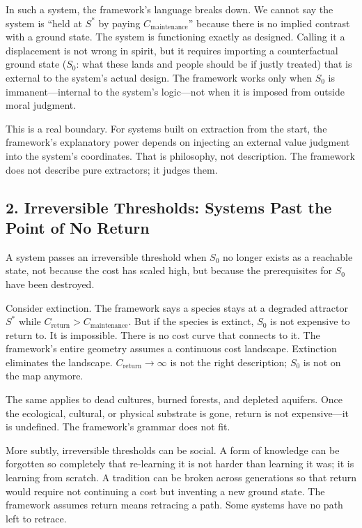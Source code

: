 \documentclass[12pt]{article}
\begin{document}
In such a system, the framework's language breaks down. We cannot say the system is ``held at $S^*$ by paying $C_{\text{maintenance}}$'' because there is no implied contrast with a ground state. The system is functioning exactly as designed. Calling it a displacement is not wrong in spirit, but it requires importing a counterfactual ground state ($S_0$: what these lands and people should be if justly treated) that is external to the system's actual design. The framework works only when $S_0$ is immanent—internal to the system's logic—not when it is imposed from outside moral judgment.

This is a real boundary. For systems built on extraction from the start, the framework's explanatory power depends on injecting an external value judgment into the system's coordinates. That is philosophy, not description. The framework does not describe pure extractors; it judges them.

\subsection{2. Irreversible Thresholds: Systems Past the Point of No Return}

A system passes an irreversible threshold when $S_0$ no longer exists as a reachable state, not because the cost has scaled high, but because the prerequisites for $S_0$ have been destroyed.

Consider extinction. The framework says a species stays at a degraded attractor $S^*$ while $C_{\text{return}} > C_{\text{maintenance}}$. But if the species is extinct, $S_0$ is not expensive to return to. It is impossible. There is no cost curve that connects to it. The framework's entire geometry assumes a continuous cost landscape. Extinction eliminates the landscape. $C_{\text{return}} \to \infty$ is not the right description; $S_0$ is not on the map anymore.

The same applies to dead cultures, burned forests, and depleted aquifers. Once the ecological, cultural, or physical substrate is gone, return is not expensive—it is undefined. The framework's grammar does not fit.

More subtly, irreversible thresholds can be social. A form of knowledge can be forgotten so completely that re-learning it is not harder than learning it was; it is learning from scratch. A tradition can be broken across generations so that return would require not continuing a cost but inventing a new ground state. The framework assumes return means retracing a path. Some systems have no path left to retrace.
\end{document}
